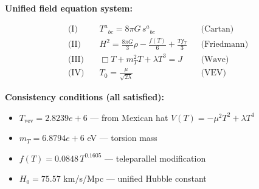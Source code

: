 
\textbf{Unified field equation system:}

\begin{align}
  \text{(I)} \quad & T^a{}_{bc} = 8\pi G \, s^a{}_{bc} && \text{(Cartan)} \\
  \text{(II)} \quad & H^2 = \frac{8\pi G}{3}\rho - \frac{f(T)}{6} + \frac{Tf_T}{3} && \text{(Friedmann)} \\
  \text{(III)} \quad & \Box T + m_T^2 T + \lambda T^3 = J && \text{(Wave)} \\
  \text{(IV)} \quad & T_0 = \frac{\mu}{\sqrt{2\lambda}} && \text{(VEV)}
\end{align}

\textbf{Consistency conditions (all satisfied):}
\begin{itemize}
  \item $T_{\text{vev}} = 2.8239e+6$ — from Mexican hat $V(T) = -\mu^2 T^2 + \lambda T^4$
  \item $m_T = 6.8794e+6$ eV — torsion mass
  \item $f(T) = 0.0848 \, T^{0.1605}$ — teleparallel modification
  \item $H_0 = 75.57$ km/s/Mpc — unified Hubble constant
\end{itemize}